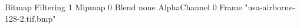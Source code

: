{Bitmap
	{Filtering 1}
	{Mipmap 0}
	{Blend none}
	{AlphaChannel 0}
	{Frame "usa-airborne-128-2.tif.bmp"}
}
